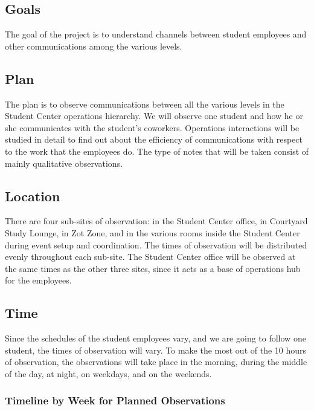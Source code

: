 \documentclass[letterpaper, 12pt]{report}
\begin{document}
\subsection{Goals}
The goal of the project is to understand channels between student employees and other communications among the various levels.

\subsection{Plan}
The plan is to observe communications between all the various levels in the Student Center operations hierarchy. We will observe one student and how he or she communicates with the student's coworkers. Operations interactions will be studied in detail to find out about the efficiency of communications with respect to the work that the employees do. The type of notes that will be taken consist of mainly qualitative observations.

\subsection{Location}
There are four sub-sites of observation: in the Student Center office, in Courtyard Study Lounge, in Zot Zone, and in the various rooms inside the Student Center during event setup and coordination. The times of observation will be distributed evenly throughout each sub-site. The Student Center office will be observed at the same times as the other three sites, since it acts as a base of operations hub for the employees.

\subsection{Time}

Since the schedules of the student employees vary, and we are going to follow one student, the times of observation will vary. To make the most out of the 10 hours of observation, the observations will take place in the morning, during the middle of the day, at night, on weekdays, and on the weekends.

\subsubsection*{Timeline by Week for Planned Observations}

\begin{chronology}[1]{2}{10}{\textwidth}[\textwidth]
\end{chronology}
\end{document}
